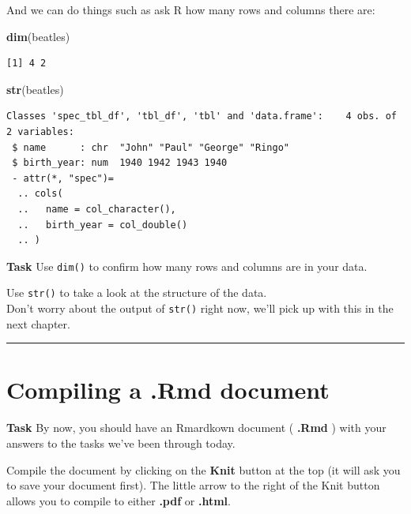 \documentclass[]{book}
\newenvironment{Shaded}{\begin{snugshade}}{\end{snugshade}}
\newcommand{\KeywordTok}[1]{\textcolor[rgb]{0.13,0.29,0.53}{\textbf{#1}}}
\newcommand{\NormalTok}[1]{#1}
\begin{document}
And we can do things such as ask R how many rows and columns there are:

\begin{Shaded}
\begin{Highlighting}[]
\KeywordTok{dim}\NormalTok{(beatles)}
\end{Highlighting}
\end{Shaded}

\begin{verbatim}
[1] 4 2
\end{verbatim}

\begin{Shaded}
\begin{Highlighting}[]
\KeywordTok{str}\NormalTok{(beatles)}
\end{Highlighting}
\end{Shaded}

\begin{verbatim}
Classes 'spec_tbl_df', 'tbl_df', 'tbl' and 'data.frame':    4 obs. of  2 variables:
 $ name      : chr  "John" "Paul" "George" "Ringo"
 $ birth_year: num  1940 1942 1943 1940
 - attr(*, "spec")=
  .. cols(
  ..   name = col_character(),
  ..   birth_year = col_double()
  .. )
\end{verbatim}

\textbf{Task}
Use \texttt{dim()} to confirm how many rows and columns are in your data.

Use \texttt{str()} to take a look at the structure of the data.\\
Don't worry about the output of \texttt{str()} right now, we'll pick up with this in the next chapter.

\begin{center}\rule{0.5\linewidth}{0.5pt}\end{center}

\hypertarget{compiling-a-.rmd-document}{%
\section{Compiling a .Rmd document}\label{compiling-a-.rmd-document}}

\textbf{Task}
By now, you should have an Rmardkown document ( \textbf{.Rmd} ) with your answers to the tasks we've been through today.

Compile the document by clicking on the \textbf{Knit} button at the top (it will ask you to save your document first). The little arrow to the right of the Knit button allows you to compile to either \textbf{.pdf} or \textbf{.html}.
\end{document}
